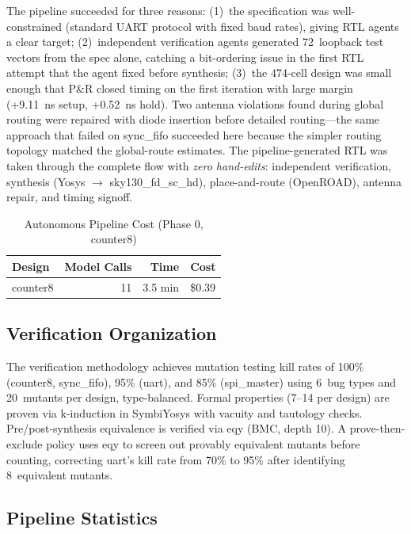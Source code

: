 \documentclass[journal]{IEEEtran}
\begin{document}
The pipeline succeeded for three reasons: (1)~the specification was well-constrained (standard UART protocol with fixed baud rates), giving RTL agents a clear target; (2)~independent verification agents generated 72~loopback test vectors from the spec alone, catching a bit-ordering issue in the first RTL attempt that the agent fixed before synthesis; (3)~the 474-cell design was small enough that P\&R closed timing on the first iteration with large margin (+9.11~ns setup, +0.52~ns hold). Two antenna violations found during global routing were repaired with diode insertion before detailed routing---the same approach that failed on sync\_fifo succeeded here because the simpler routing topology matched the global-route estimates. The pipeline-generated RTL was taken through the complete flow with \emph{zero hand-edits}: independent verification, synthesis (Yosys $\rightarrow$ sky130\_fd\_sc\_hd), place-and-route (OpenROAD), antenna repair, and timing signoff.

\begin{table}[t]
\centering
\caption{Autonomous Pipeline Cost (Phase 0, counter8)}
\label{tab:cost}
\begin{tabular}{@{}lrrl@{}}
\toprule
\textbf{Design} & \textbf{Model Calls} & \textbf{Time} & \textbf{Cost} \\
\midrule
counter8 & 11 & 3.5 min & \$0.39 \\
\bottomrule
\end{tabular}
\end{table}

\subsection{Verification Organization}

The verification methodology achieves mutation testing kill rates of 100\% (counter8, sync\_fifo), 95\% (uart), and 85\% (spi\_master) using 6~bug types and 20~mutants per design, type-balanced. Formal properties (7--14 per design) are proven via k-induction in SymbiYosys with vacuity and tautology checks. Pre/post-synthesis equivalence is verified via eqy (BMC, depth 10). A prove-then-exclude policy uses eqy to screen out provably equivalent mutants before counting, correcting uart's kill rate from 70\% to 95\% after identifying 8~equivalent mutants.

\subsection{Pipeline Statistics}
\end{document}
